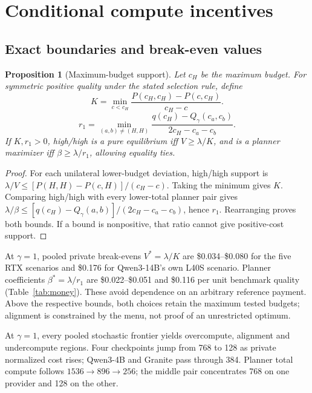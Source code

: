 \documentclass[sigconf,anonymous,nonacm]{acmart}
\newtheorem{proposition}{Proposition}
\begin{document}
\section{Conditional compute incentives}
\label{sec:allocation}
\subsection{Exact boundaries and break-even values}
\begin{proposition}[Maximum-budget support]
Let $c_H$ be the maximum budget. For symmetric positive quality under the stated selection rule, define
\[
K=\min_{c<c_H}\frac{P(c_H,c_H)-P(c,c_H)}{c_H-c}.\]
\[
r_1=\min_{(a,b)\ne(H,H)}\frac{q(c_H)-Q_\gamma(c_a,c_b)}{2c_H-c_a-c_b}.
\]
If $K,r_1>0$, high/high is a pure equilibrium iff $V\geq\lambda/K$, and is a planner maximizer iff $\beta\geq\lambda/r_1$, allowing equality ties.
\end{proposition}
\begin{proof}
For each unilateral lower-budget deviation, high/high support is $\lambda/V\leq[P(H,H)-P(c,H)]/(c_H-c)$. Taking the minimum gives $K$. Comparing high/high with every lower-total planner pair gives $\lambda/\beta\leq[q(c_H)-Q_\gamma(a,b)]/(2c_H-c_a-c_b)$, hence $r_1$. Rearranging proves both bounds. If a bound is nonpositive, that ratio cannot give positive-cost support.
\end{proof}
At $\gamma=1$, pooled private break-evens $V^*=\lambda/K$ are \$0.034--\$0.080 for the five RTX scenarios and \$0.176 for Qwen3-14B's own L40S scenario. Planner coefficients $\beta^*=\lambda/r_1$ are \$0.022--\$0.051 and \$0.116 per unit benchmark quality (Table~\ref{tab:money}). These avoid dependence on an arbitrary reference payment. Above the respective bounds, both choices retain the maximum tested budgets; alignment is constrained by the menu, not proof of an unrestricted optimum.

At $\gamma=1$, every pooled stochastic frontier yields overcompute, alignment and undercompute regions. Four checkpoints jump from 768 to 128 as private normalized cost rises; Qwen3-4B and Granite pass through 384. Planner total compute follows $1536\to896\to256$; the middle pair concentrates 768 on one provider and 128 on the other.
\end{document}
